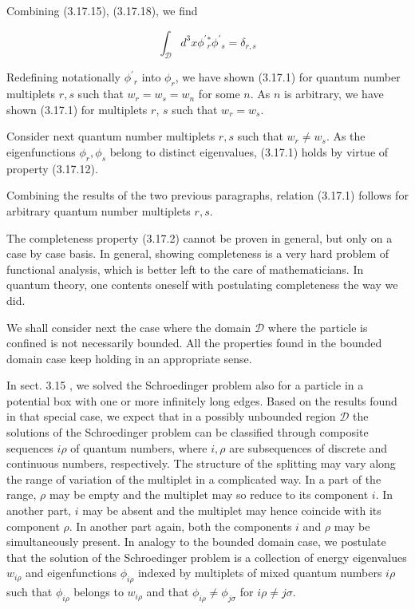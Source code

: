 \documentclass{article}
\begin{document}
Combining (3.17.15), (3.17.18), we find
 
\begin{equation*}
\int_{\mathcal{D}} d^{3} x \phi^{\prime}{ }_{r}^{*} \phi^{\prime}{ }_{s}=\delta_{r, s} \tag{3.17.19}
\end{equation*}
 

Redefining notationally $\phi^{\prime}{ }_{r}$ into $\phi_{r}$, we have shown (3.17.1) for quantum number multiplets $r, s$ such that $w_{r}=w_{s}=w_{n}$ for some $n$. As $n$ is arbitrary, we have shown (3.17.1) for multiplets $r$, $s$ such that $w_{r}=w_{s}$.

Consider next quantum number multiplets $r, s$ such that $w_{r} \neq w_{s}$. As the eigenfunctions $\phi_{r}, \phi_{s}$ belong to distinct eigenvalues, (3.17.1) holds by virtue of property (3.17.12).

Combining the results of the two previous paragraphs, relation (3.17.1) follows for arbitrary quantum number multiplets $r, s$.

The completeness property (3.17.2) cannot be proven in general, but only on a case by case basis. In general, showing completeness is a very hard problem of functional analysis, which is better left to the care of mathematicians. In quantum theory, one contents oneself with postulating completeness the way we did.

We shall consider next the case where the domain $\mathcal{D}$ where the particle is confined is not necessarily bounded. All the properties found in the bounded domain case keep holding in an appropriate sense.

In sect. 3.15 , we solved the Schroedinger problem also for a particle in a potential box with one or more infinitely long edges. Based on the results found in that special case, we expect that in a possibly unbounded region $\mathcal{D}$ the solutions of the Schroedinger problem can be classified through composite sequences $i \rho$ of quantum numbers, where $i, \rho$ are subsequences of discrete and continuous numbers, respectively. The structure of the splitting may vary along the range of variation of the multiplet in a complicated way. In a part of the range, $\rho$ may be empty and the multiplet may so reduce to its component $i$. In another part, $i$ may be absent and the multiplet may hence coincide with its component $\rho$. In another part again, both the components $i$ and $\rho$ may be simultaneously present. In analogy to the bounded domain case, we postulate that
the solution of the Schroedinger problem is a collection of energy eigenvalues $w_{i \rho}$ and eigenfunctions $\phi_{i \rho}$ indexed by multiplets of mixed quantum numbers $i \rho$ such that $\phi_{i \rho}$ belongs to $w_{i \rho}$ and that $\phi_{i \rho} \neq \phi_{j \sigma}$ for $i \rho \neq j \sigma$.
\end{document}
